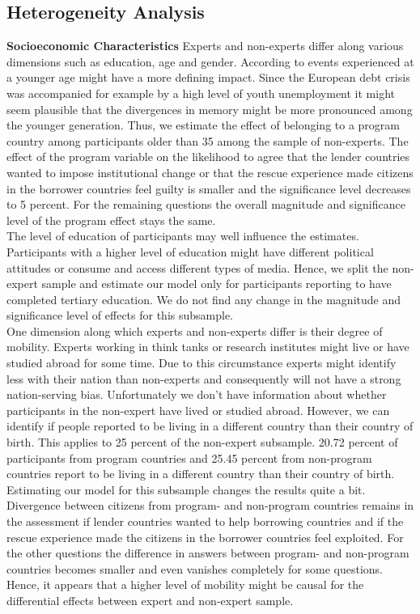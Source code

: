 \subsection{Heterogeneity Analysis}
\textbf{Socioeconomic Characteristics}
 Experts and non-experts differ along various dimensions such as education, age and gender.
 According to \cite{baumeister} events experienced at a younger age might have a more defining impact. Since the European debt crisis was accompanied for example by a high level of youth unemployment it might seem plausible that the divergences in memory might be more pronounced among the younger generation. Thus, we estimate the effect of belonging to a program country among participants older than 35 among the sample of non-experts.  The effect of the program variable on the likelihood to agree that the lender countries wanted to impose institutional change or that the rescue experience made citizens in the borrower countries feel guilty is smaller and the significance level decreases to 5 percent. For the remaining questions the overall magnitude and significance level of the program effect stays the same. 
\\
The level of education of participants may well influence the estimates. Participants with a higher level of education might have different political attitudes or consume and access different types of media. Hence, we split the non-expert sample and estimate our model only for participants reporting to have completed tertiary education. We do not find any change in the magnitude and significance level of effects for this subsample. 
\\
One dimension along which experts and non-experts differ is their degree of mobility. Experts working in think tanks or research institutes might live or have studied abroad for some time. Due to this circumstance experts might identify less with their nation than non-experts and consequently will not have a strong nation-serving bias. Unfortunately we don't have information about whether participants in the non-expert have lived or studied abroad. However, we can identify if people reported to be living in a different country than their country of birth. This applies to 25 percent of the non-expert subsample. 20.72 percent of participants from program countries and 25.45 percent from non-program countries report to be living in a different country than their country of birth. Estimating our model for this subsample changes the results quite a bit. Divergence between citizens from program- and non-program countries remains in the assessment if lender countries wanted to help borrowing countries and if the rescue experience made the citizens in the borrower countries feel exploited. For the other questions the difference in answers between program- and non-program countries becomes smaller and even vanishes completely for some questions. Hence, it appears that a higher level of mobility might be causal for the differential effects between expert and non-expert sample.  \\
